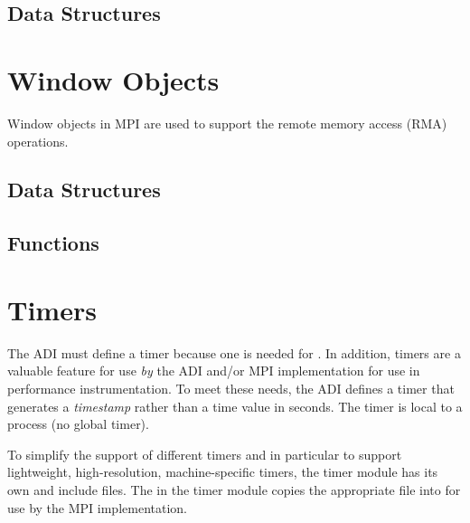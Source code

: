 \documentclass[dvipdfm]{article}
\begin{document}
%
\subsection{Data Structures}

%

\section{Window Objects}
\label{sec:window-objects}
Window objects in MPI are used to support the remote memory access
(RMA) operations.  
\subsection{Data Structures}

\subsection{Functions}


\section{Timers}
\label{sec:timers}
The ADI must define a timer because one is needed for .  In
addition, timers are a valuable feature for use \emph{by} the ADI and/or MPI
implementation for use in performance instrumentation.  To meet these needs,
the ADI defines 
a timer that generates a 
\emph{timestamp} rather than a time value in seconds.  
The timer is local to a process (no global timer).

To simplify the support of different timers and in particular to
support lightweight, high-resolution, machine-specific timers, the
timer module has its own  and include files.  The
 in the timer module copies the appropriate
 file into  for use by the
MPI implementation.
\end{document}
